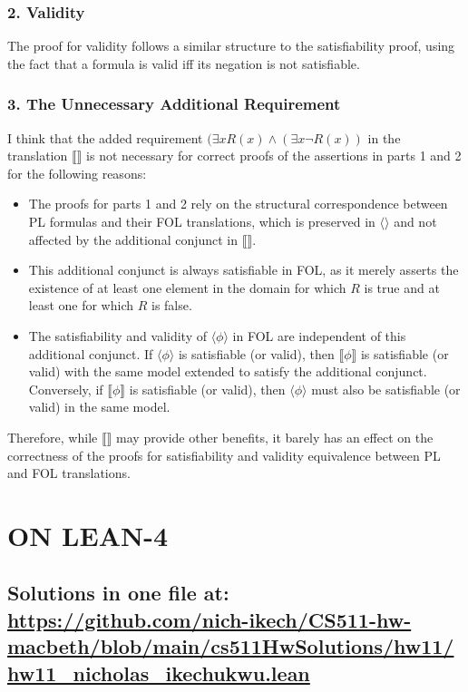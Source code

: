\documentclass{article}
\begin{document}
\newpage
\subsubsection*{2. Validity}

The proof for validity follows a similar structure to the satisfiability proof, using the fact that a formula is valid iff its negation is not satisfiable.


\newpage
\subsubsection*{3. The Unnecessary Additional Requirement}

I think that the added requirement $(\exists x R(x) \wedge (\exists x \neg R(x))$ in the translation $\llbracket \rrbracket$
is not necessary for correct proofs of the assertions in parts 1 and 2 for the following reasons:

\begin{itemize}
\item The proofs for parts 1 and 2 rely on the structural correspondence between PL formulas and their FOL translations,
 which is preserved in $\langle \rangle$ and not affected by the additional conjunct in $\llbracket \rrbracket$.
\item This additional conjunct is always satisfiable in FOL, as it merely asserts the existence of at least one element in
 the domain for which $R$ is true and at least one for which $R$ is false.
\item The satisfiability and validity of $\langle\phi\rangle$ in FOL are independent of this additional conjunct.
 If $\langle\phi\rangle$ is satisfiable (or valid), then $\llbracket\phi\rrbracket$ is satisfiable (or valid) with the same model extended to satisfy the additional conjunct. Conversely, if $\llbracket\phi\rrbracket$ is satisfiable (or valid), then $\langle\phi\rangle$ must also be satisfiable (or valid) in the same model.
\end{itemize}

Therefore, while $\llbracket \rrbracket$ may provide other benefits, 
it barely has an effect on the correctness of the proofs for satisfiability and validity equivalence between PL and FOL translations.
\newpage



\section*{ON LEAN-4}
\subsection*{Solutions in one file at: 
\url{https://github.com/nich-ikech/CS511-hw-macbeth/blob/main/cs511HwSolutions/hw11/hw11_nicholas_ikechukwu.lean}}
\end{document}
